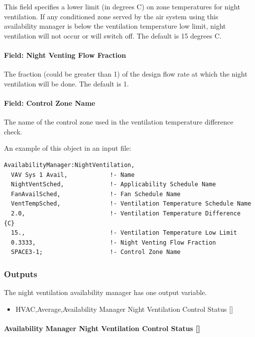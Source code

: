 This field specifies a lower limit (in degrees C) on zone temperatures for night ventilation. If any conditioned zone served by the air system using this availability manager is below the ventilation temperature low limit, night ventilation will not occur or will switch off. The default is 15 degrees C.

\paragraph{Field: Night Venting Flow Fraction}\label{field-night-venting-flow-fraction}

The fraction (could be greater than 1) of the design flow rate at which the night ventilation will be done. The default is 1.

\paragraph{Field: Control Zone Name}\label{field-control-zone-name-000}

The name of the control zone used in the ventilation temperature difference check.

An example of this object in an input file:

\begin{lstlisting}
AvailabilityManager:NightVentilation,
  VAV Sys 1 Avail,            !- Name
  NightVentSched,             !- Applicability Schedule Name
  FanAvailSched,              !- Fan Schedule Name
  VentTempSched,              !- Ventilation Temperature Schedule Name
  2.0,                        !- Ventilation Temperature Difference   {C}
  15.,                        !- Ventilation Temperature Low Limit
  0.3333,                     !- Night Venting Flow Fraction
  SPACE3-1;                   !- Control Zone Name
\end{lstlisting}

\subsubsection{Outputs}\label{outputs-8-008}

The night ventilation availability manager has one output variable.

\begin{itemize}
\tightlist
\item
  HVAC,Average,Availability Manager Night Ventilation Control Status {[]}
\end{itemize}

\paragraph{Availability Manager Night Ventilation Control Status {[]}}\label{availability-manager-night-ventilation-control-status}

